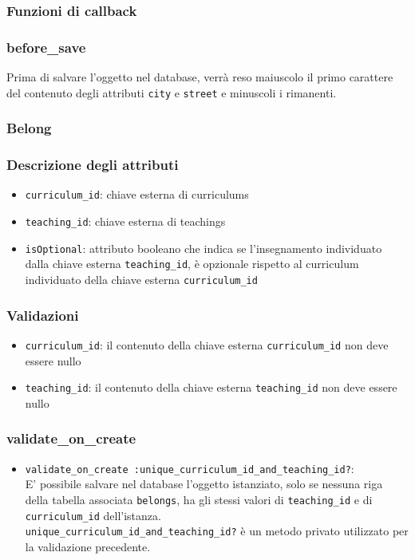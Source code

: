 \documentclass[11pt,a4paper]{article}
\begin{document}
\subsubsection*{Funzioni di callback}
\subsubsection*{before\_save}
Prima di salvare l'oggetto nel database, verrà reso maiuscolo il primo carattere del contenuto degli attributi \verb|city| e \verb|street| e minuscoli i rimanenti.
\subsubsection{Belong}
\subsubsection*{Descrizione degli attributi}
\begin{itemize}
 \item \verb|curriculum_id|: chiave esterna di curriculums
 \item \verb|teaching_id|: chiave esterna di teachings
 \item \verb|isOptional|: attributo booleano che indica se l'insegnamento individuato dalla chiave esterna \verb|teaching_id|, è opzionale rispetto al curriculum individuato della chiave esterna \verb|curriculum_id|	
\end{itemize}
\subsubsection*{Validazioni}
\begin{itemize}
 \item \verb|curriculum_id|: il contenuto della chiave esterna \verb|curriculum_id| non deve essere nullo 
 \item \verb|teaching_id|: il contenuto della chiave esterna \verb|teaching_id| non deve essere nullo
\end{itemize}
\subsubsection*{validate\_on\_create}
\begin{itemize}
 \item \verb|validate_on_create :unique_curriculum_id_and_teaching_id?|: \\E' possibile salvare nel database l'oggetto istanziato, solo se nessuna riga della tabella associata \verb|belongs|, ha gli stessi valori di \verb|teaching_id| e di \verb|curriculum_id| dell'istanza.\\
 \verb|unique_curriculum_id_and_teaching_id?| è un metodo privato utilizzato per la validazione precedente.
\end{itemize}
\end{document}
